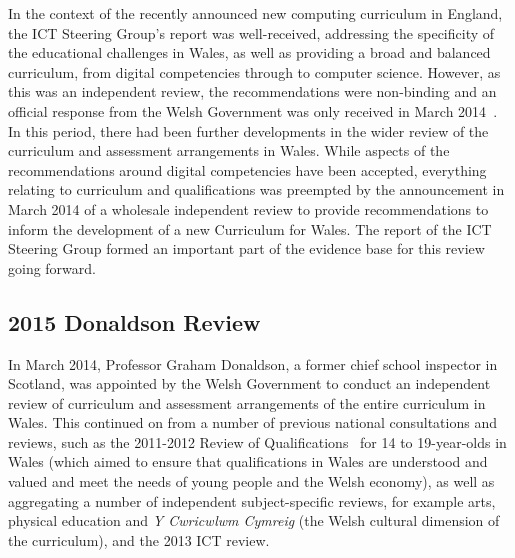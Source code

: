 
In the context of the recently announced new computing curriculum in
England, the ICT Steering Group's report was well-received, addressing
the specificity of the educational challenges in Wales, as well as
providing a broad and balanced curriculum, from digital competencies
through to computer science. However, as this was an independent
review, the recommendations were non-binding and an official response
from the Welsh Government was only received in March
2014~\cite{wgictresponse:2014}. In this period, there had been further
developments in the wider review of the curriculum and assessment
arrangements in Wales. While aspects of the recommendations around
digital competencies have been accepted, everything relating to
curriculum and qualifications was preempted by the announcement
in March 2014 of a wholesale independent review to provide
recommendations to inform the development of a new Curriculum for
Wales. The report of the ICT Steering Group formed an important
part of the evidence base for this review going forward.

\subsection{2015 Donaldson Review}

In March 2014, Professor Graham Donaldson, a former chief school
inspector in Scotland, was appointed by the Welsh Government to
conduct an independent review of curriculum and assessment
arrangements of the entire curriculum in Wales.  This continued on
from a number of previous national consultations and reviews, such as
the 2011-2012 Review of Qualifications~\cite{wgrev14-19:2014} for 14
to 19-year-olds in Wales (which aimed to ensure that qualifications in
Wales are understood and valued and meet the needs of young people and
the Welsh economy), as well as aggregating a number of independent
subject-specific reviews, for example arts, physical education and
{\emph{Y Cwricwlwm Cymreig}} (the Welsh cultural dimension of the
curriculum), and the 2013 ICT review.

